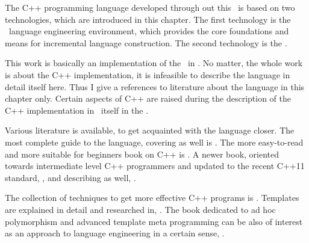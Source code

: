 
The C++ programming language developed through out this \MT\ is based on two technologies, which are 
introduced in this chapter. The first technology is the \jbmps\ language engineering environment, which 
provides the core foundations and means for incremental language construction. The second technology is
the \mbdp. 








This work is basically an implementation of the \cpppl\ in \jbmps. No matter, the whole work 
is about the C++ implementation, it is infeasible to describe the language in detail itself
here. Thus I give a references to literature about the language in this chapter only. Certain 
aspects of C++ are raised during the description of the C++ implementation in \jbmps\ itself in 
the .

Various literature is available, to get acquainted with the language closer. The most complete
guide to the language, covering  as well is \cite{stroustrupcpp2000}. The more 
easy-to-read and more suitable for beginners book on C++ is \cite{schildtcpp}. A newer book,
oriented towards intermediate level C++ programmers and updated to the recent C++11 standard, \cite{cpp11}, and describing 
 as well, \cite{pratacpp}.

The collection of techniques to get more effective C++ programs is \cite{meyerseffcpp}. Templates are explained in 
detail and researched in, \cite{josuttistemplates}. The book dedicated to ad hoc polymorphism and advanced template meta programming can be 
also of interest as an approach to language engineering in a certain sense, \cite{alexandrescumeta}.